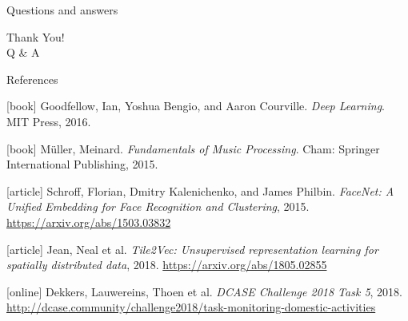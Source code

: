 \documentclass[aspectratio=169, professionalfonts]{beamer}
\begin{document}
\begin{frame}{Questions and answers}
    \begin{center}
    {\fontsize{40}{50}\selectfont Thank You! \\[10pt] Q \& A}
    \end{center}
\end{frame}

\begin{frame}[allowframebreaks]{References}
    \begin{thebibliography}{}
        [book]
        Goodfellow, Ian, Yoshua Bengio, and Aaron Courville.
        \newblock \emph{Deep Learning}.
        \newblock MIT Press, 2016.
        
        [book]
        Müller, Meinard.
        \newblock \emph{Fundamentals of Music Processing}.
        \newblock Cham: Springer International Publishing, 2015.
        
        [article]
        Schroff, Florian, Dmitry Kalenichenko, and James Philbin.
        \newblock \emph{FaceNet: A Unified Embedding for Face Recognition and Clustering}, 2015.
        \newblock \url{https://arxiv.org/abs/1503.03832}

        [article]
        Jean, Neal et al.
        \newblock \emph{Tile2Vec: Unsupervised representation learning for spatially distributed data}, 2018.
        \newblock \url{https://arxiv.org/abs/1805.02855}
        
        [online]
        Dekkers, Lauwereins, Thoen et al.
        \newblock \emph{DCASE Challenge 2018 Task 5}, 2018.
        \newblock \url{http://dcase.community/challenge2018/task-monitoring-domestic-activities}
    \end{thebibliography}
\end{frame}
\end{document}
